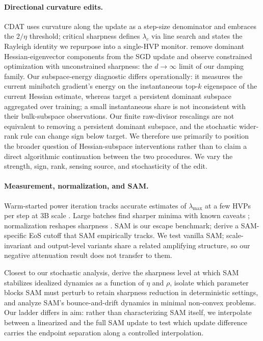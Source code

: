 \documentclass{article}
\theoremstyle{plain}
\theoremstyle{definition}
\theoremstyle{remark}
\newcommand{\lmax}{\lambda_{\max}}
\begin{document}
\paragraph{Directional curvature edits.} CDAT \citep{roulet2024cdat}
uses curvature along the update as a step-size denominator and embraces
the $2/\eta$ threshold; critical sharpness \citep{kalra2026scalable}
defines $\lambda_c$ via line search and states the Rayleigh identity we
repurpose into a single-HVP monitor. \citet{song2025bulk} remove dominant
Hessian-eigenvector components from the SGD update and observe
constrained optimization with unconstrained sharpness: the
$d\!\to\!\infty$ limit of our damping family. Our subspace-energy
diagnostic differs
operationally: it measures the current minibatch gradient's energy on
the instantaneous top-$k$ eigenspace of the current Hessian estimate,
whereas \citet{song2025bulk} target a persistent dominant subspace
aggregated over training; a small instantaneous share is not
inconsistent with their bulk-subspace observations. Our finite
raw-divisor rescalings are not equivalent to removing a persistent
dominant subspace, and the stochastic wider-rank rule can change
sign below target. We therefore use \citet{song2025bulk} primarily
to position the broader question of Hessian-subspace interventions
rather than to claim a direct algorithmic continuation between the
two procedures. We vary the
strength, sign, rank, sensing source, and stochasticity of the edit.

\paragraph{Measurement, normalization, and SAM.} Warm-started power
iteration tracks accurate estimates of $\lmax$ at a few HVPs per step at 3B scale
\citep{ramasinghe2026taming}. Large batches find sharper minima
\citep{keskar2017largebatch} with known caveats \citep{dinh2017sharp};
normalization reshapes sharpness \citep{wei2019bn,lyu2022spherical}.
SAM \citep{foret2021sam} is our escape benchmark; \citet{long2024sam}
derive a SAM-specific EoS cutoff that SAM empirically tracks. We test
vanilla SAM; scale-invariant and output-level variants
\citep{kwon2021asam,du2022saf} share a related amplifying structure, so our
negative attenuation result does not transfer to them.

Closest to our stochastic analysis, \citet{agarwala2023sam} derive the
sharpness level at which SAM stabilizes idealized dynamics as a function of
$\eta$ and $\rho$, \citet{wen2023sharpness} isolate which parameter blocks
SAM must perturb to retain sharpness reduction in deterministic settings, and
\citet{bartlett2023dynamics} analyze SAM's bounce-and-drift dynamics in
minimal non-convex problems. Our ladder differs in aim: rather than
characterizing SAM itself, we interpolate between a linearized and the
full SAM update to test which update difference carries the endpoint
separation along a controlled interpolation.
\end{document}
